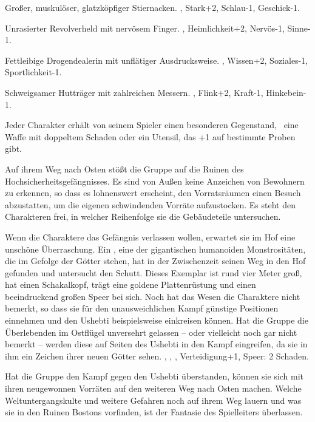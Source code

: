 {		 Großer, muskulöser, glatzköpfiger Stier\-nacken. , Stark+2, Schlau-1, Geschick-1.

		 Unrasierter Revolverheld mit nervösem Finger. , Heimlichkeit+2, Nervös-1, Sinne-1.

		 Fettleibige Drogendealerin mit unflätiger Ausdrucksweise. , Wissen+2, Soziales-1, Sportlichkeit-1.

		 Schweigsamer Hutträger mit zahlreichen Messern. , Flink+2, Kraft-1, Hinkebein-1.

		Jeder Charakter erhält von seinem Spieler einen besonderen Gegenstand, \zB\ eine Waffe mit doppeltem Schaden oder ein Utensil, das +1 auf bestimmte Proben gibt.


		\noindent
		Auf ihrem Weg nach Osten stößt die Gruppe auf die Ruinen des Hochsicherheitsgefängnisses. Es sind von Außen keine Anzeichen von Bewohnern zu erkennen, so dass es lohnenswert erscheint, den Vorratsräumen einen Besuch abzustatten, um die eigenen schwindenden Vorräte aufzustocken. Es steht den Charakteren frei, in welcher Reihenfolge sie die Gebäudeteile untersuchen.

		Wenn die Charaktere das Gefängnis verlassen wollen, erwartet sie im Hof eine unschöne Überraschung. Ein , eine der gigantischen humanoiden Monstrositäten, die im Gefolge der Götter stehen, hat in der Zwischenzeit seinen Weg in den Hof gefunden und untersucht den Schutt. Dieses Exemplar ist rund vier Meter groß, hat einen Schakalkopf, trägt eine goldene Plattenrüstung und einen beeindruckend großen Speer bei sich. Noch hat das Wesen die Charaktere nicht bemerkt, so dass sie für den unausweichlichen Kampf günstige Positionen einnehmen und den Ushebti beispielsweise einkreisen können. Hat die Gruppe die Überlebenden im Ostflügel unversehrt gelassen -- oder vielleicht noch gar nicht bemerkt -- werden diese auf Seiten des Ushebti in den Kampf eingreifen, da sie in ihm ein Zeichen ihrer neuen Götter sehen.  , , , Verteidigung+1, Speer: 2 Schaden.


		\noindent
		Hat die Gruppe den Kampf gegen den Ushebti überstanden, können sie sich mit ihren neugewonnen Vorräten auf den weiteren Weg nach Osten machen. Welche Weltuntergangskulte und weitere Gefahren noch auf ihrem Weg lauern und was sie in den Ruinen Bostons vorfinden, ist der Fantasie des Spielleiters überlassen.
}
